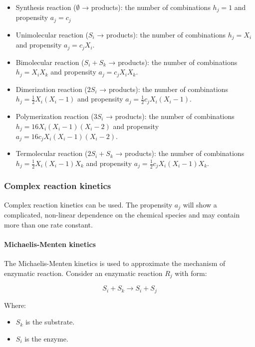     \begin{itemize}
      \item Synthesis reaction ($\emptyset$ → products): the number of combinations $ h_j = 1 $ and propensity $ a_j =c_j $
      \item Unimolecular reaction ($ S_i$ → products): the number of combinations $h_j= X_i$ and propensity $ a_j = c_jX_i $.
      \item Bimolecular reaction ($ S_i + S_k$ → products): the number of combinations $ h_j = X_iX_k$ and propensity $ a_j = c_jX_iX_k $.
      \item Dimerization reaction ($2S_i$ → products): the number of combinations $ h_j = \frac{1}{2}X_i(X_i -1) $ and propensity $ a_j = \frac{1}{2}c_jX_i(X_i -1) $.
      \item Polymerization reaction ($3S_i$ → products): the number of combinations $ h_j = 16X_i(X_i -1)(X_i -2)$ and propensity $ a_j = 16c_jX_i(X_i -1)(X_i -2) $.
      \item Termolecular reaction ($2S_i + S_k$ → products): the number of combinations $ h_j = \frac{1}{2}X_i(X_i -1)X_k$ and propensity $ a_j = \frac{1}{2}c_jX_i(X_i -1)X_k $.
    \end{itemize}

    \subsubsection{Complex reaction kinetics}
    Complex reaction kinetics can be used.
    The propensity $a_j$ will show a complicated, non-linear dependence on the chemical species and may contain more than one rate constant.

      \paragraph{Michaelis-Menten kinetics}
      The Michaelis-Menten kinetics is used to approximate the mechanism of enzymatic reaction.
      Consider an enzymatic reaction $R_j$ with form:

      $$S_i+S_k \rightarrow S_i + S_j$$

      Where:

      \begin{multicols}{2}
        \begin{itemize}
          \item $S_k$ is the substrate.
          \item $S_i$ is the enzyme.
        \end{itemize}
      \end{multicols}

